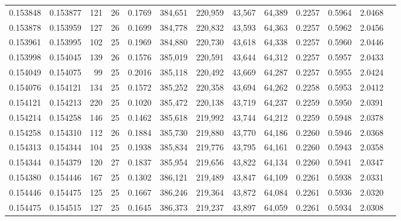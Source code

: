 \begin{tabular}{rrrrrrrrrrrrr}
0.153848 & 0.153877 & 121 &  26 &                                     0.1769 & 384,651 & 220,959 &  43,567 &  64,389 & 0.2257 & 0.5964 & 2.0468 \\
0.153878 & 0.153959 & 127 &  26 &                                     0.1699 & 384,778 & 220,832 &  43,593 &  64,363 & 0.2257 & 0.5962 & 2.0456 \\
0.153961 & 0.153995 & 102 &  25 &                                     0.1969 & 384,880 & 220,730 &  43,618 &  64,338 & 0.2257 & 0.5960 & 2.0446 \\
0.153998 & 0.154045 & 139 &  26 &                                     0.1576 & 385,019 & 220,591 &  43,644 &  64,312 & 0.2257 & 0.5957 & 2.0433 \\
0.154049 & 0.154075 &  99 &  25 &                                     0.2016 & 385,118 & 220,492 &  43,669 &  64,287 & 0.2257 & 0.5955 & 2.0424 \\
0.154076 & 0.154121 & 134 &  25 &                                     0.1572 & 385,252 & 220,358 &  43,694 &  64,262 & 0.2258 & 0.5953 & 2.0412 \\
0.154121 & 0.154213 & 220 &  25 &                                     0.1020 & 385,472 & 220,138 &  43,719 &  64,237 & 0.2259 & 0.5950 & 2.0391 \\
0.154214 & 0.154258 & 146 &  25 &                                     0.1462 & 385,618 & 219,992 &  43,744 &  64,212 & 0.2259 & 0.5948 & 2.0378 \\
0.154258 & 0.154310 & 112 &  26 &                                     0.1884 & 385,730 & 219,880 &  43,770 &  64,186 & 0.2260 & 0.5946 & 2.0368 \\
0.154313 & 0.154344 & 104 &  25 &                                     0.1938 & 385,834 & 219,776 &  43,795 &  64,161 & 0.2260 & 0.5943 & 2.0358 \\
0.154344 & 0.154379 & 120 &  27 &                                     0.1837 & 385,954 & 219,656 &  43,822 &  64,134 & 0.2260 & 0.5941 & 2.0347 \\
0.154380 & 0.154446 & 167 &  25 &                                     0.1302 & 386,121 & 219,489 &  43,847 &  64,109 & 0.2261 & 0.5938 & 2.0331 \\
0.154446 & 0.154475 & 125 &  25 &                                     0.1667 & 386,246 & 219,364 &  43,872 &  64,084 & 0.2261 & 0.5936 & 2.0320 \\
0.154475 & 0.154515 & 127 &  25 &                                     0.1645 & 386,373 & 219,237 &  43,897 &  64,059 & 0.2261 & 0.5934 & 2.0308 \\

\end{tabular}
